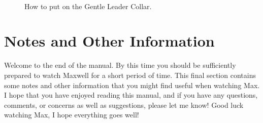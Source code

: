 \documentclass[pdftex,12pt]{article}
\begin{document}
\begin{figure}
    \\
    \bigskip
    \hspace*{\fill}
    \caption{How to put on the Gentle Leader Collar.}
    \label{fig:gentle_leader_steps}
\end{figure}

\newpage
\section{Notes and Other Information}

Welcome to the end of the manual. By this time you should be sufficiently
prepared to watch Maxwell for a short period of time. This final section
contains some notes and other information that you might find useful when
watching Max. I hope that you have enjoyed reading this manual, and if you have
any questions, comments, or concerns as well as suggestions, please let me know!
Good luck watching Max, I hope everything goes well!

\bigskip
\end{document}
